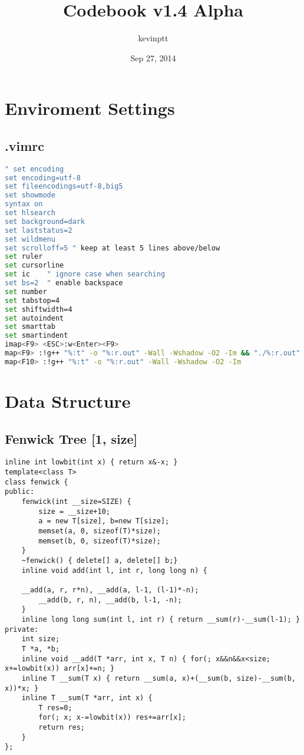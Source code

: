 \documentclass[11pt,twocolumn,a4paper]{article}
\title{Codebook v1.4 Alpha}
\author{kevinptt}
\date{Sep 27, 2014}
\begin{document}
\renewcommand{\contentsname}{Index}
\tableofcontents

\newpage
\section{Enviroment Settings}
\subsection{.vimrc}
\begin{lstlisting}[label=.vimrc,language=bash]
" set encoding
set encoding=utf-8
set fileencodings=utf-8,big5
set showmode
syntax on
set hlsearch
set background=dark
set laststatus=2
set wildmenu
set scrolloff=5 " keep at least 5 lines above/below
set ruler
set cursorline
set ic    " ignore case when searching
set bs=2  " enable backspace
set number
set tabstop=4
set shiftwidth=4
set autoindent
set smarttab
set smartindent
imap<F9> <ESC>:w<Enter><F9>
map<F9> :!g++ "%:t" -o "%:r.out" -Wall -Wshadow -O2 -Im && "./%:r.out"
map<F10> :!g++ "%:t" -o "%:r.out" -Wall -Wshadow -O2 -Im
\end{lstlisting}

\newpage
\section{Data Structure}
\subsection{Fenwick Tree [1, size]}
\begin{lstlisting}[label=Fenwick Tree]
inline int lowbit(int x) { return x&-x; }
template<class T>
class fenwick {
public:
	fenwick(int __size=SIZE) {
		size = __size+10;
		a = new T[size], b=new T[size];
		memset(a, 0, sizeof(T)*size);
		memset(b, 0, sizeof(T)*size);
	}
	~fenwick() { delete[] a, delete[] b;}
	inline void add(int l, int r, long long n) {

	__add(a, r, r*n), __add(a, l-1, (l-1)*-n);
		__add(b, r, n), __add(b, l-1, -n);
	}
	inline long long sum(int l, int r) { return __sum(r)-__sum(l-1); }
private:
	int size;
	T *a, *b;
	inline void __add(T *arr, int x, T n) { for(; x&&n&&x<size; x+=lowbit(x)) arr[x]+=n; }
	inline T __sum(T x) { return __sum(a, x)+(__sum(b, size)-__sum(b, x))*x; }
	inline T __sum(T *arr, int x) {
		T res=0;
		for(; x; x-=lowbit(x)) res+=arr[x];
		return res;
	}
};
\end{lstlisting}
\end{document}
